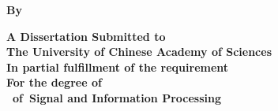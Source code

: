 \newpage
\thispagestyle{empty}

\vspace{1cm}

\begin{center}
    \songti\sanhao\bfseries \uline{\ioatitlee}          
\end{center}
\vspace{2cm}
\begin{center}
    \textbf{\sanhao By\\\xiaosan \ioaauthornamee}
\end{center}
\vspace{2cm}
\begin{center}
    \sanhao\bfseries A Dissertation Submitted to\\
    The University of Chinese Academy of Sciences\\
    In partial fulfillment of the requirement\\
    For the degree of\\
    \ioadegreee~of~Signal and Information Processing

    \vspace{2cm}
    \ioadepartmente

  \makebox{\songti\sihao\textbf{\ioadatee}}
\end{center}


